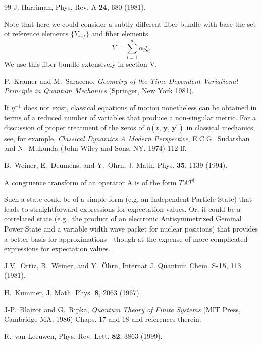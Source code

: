 \documentclass[aps,preprint]{revtex4}%
\begin{document}
\begin{thebibliography}{99}
J. Harriman, Phys. Rev. A \textbf{24}, 680 (1981).

Note that here we could consider a subtly different fiber
bundle with base the set of reference elements $\{Y_{ref}\}$ and fiber
elements
\[
Y=\sum_{i=1}^{d}\alpha_{i}\xi_{i}
\]
We use this fiber bundle extensively in section V.

P.~Kramer and M.~Saraceno, \textit{Geometry of the Time
Dependent Variational Principle in Quantum Mechanics} (Springer, New York 1981).

If $\eta^{-1}$ does not exist, classical equations of motion
nonetheless can be obtained in terms of a reduced number of variables that
produce a non-singular metric. For a discussion of proper treatment of the
zeros of $\eta(t,\, \mathbf{y},\, \mathbf{y}^{\prime}) $ in classical
mechanics, see, for example, \textit{Classical Dynamics A Modern Perspective},
E.C.G.~Sudarshan and N.~Mukunda (John Wiley and Sons, NY, 1974) 112 ff.

B.~Weiner, E.~Deumens, and Y.~\"{O}hrn, J. Math. Phys.
\textbf{35}, 1139 (1994).

A congruence transform of an operator A is of the form
$TAT^{\dag}$

Such a state could be of a simple form (e.g. an Independent
Particle State) that leads to straightforward expressions for expectation
values. Or, it could be a correlated state (e.g., the product of an electronic
Antisymmetrized Geminal Power State \cite{Ortiz81} and a variable width wave
packet for nuclear positions) that provides a better basis for approximations
- though at the expense of more complicated expressions for expectation values.

J.V.~Ortiz, B.~Weiner, and Y.~\"Ohrn, Internat J. Quantum
Chem. S-\textbf{15}, 113 (1981).

H.~Kummer, J. Math. Phys. \textbf{8}, 2063 (1967).

J-P.~Blaizot and G.~Ripka, \textit{Quantum Theory of
Finite Systems} (MIT Press, Cambridge MA, 1986) Chaps. 17 and 18 and
references therein.

R.~van Leeuwen, Phys. Rev. Lett. \textbf{82}, 3863 (1999).
\end{thebibliography}
\end{document}
